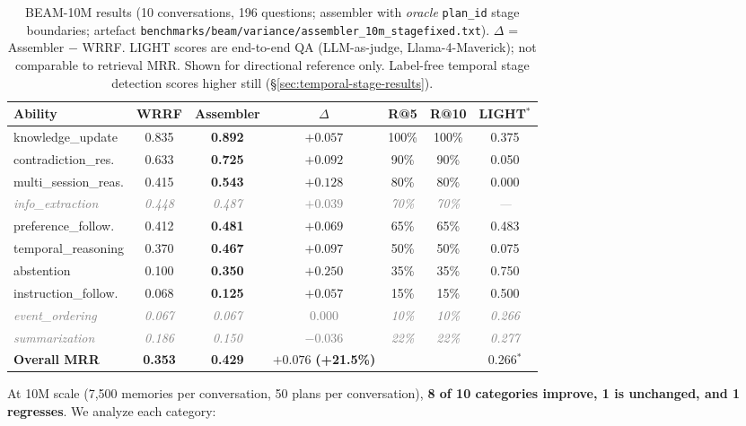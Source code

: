 \documentclass[11pt]{article}
\newcommand{\graynoise}[1]{\textcolor{gray}{\textit{#1}}}
\begin{document}
\begin{table}[t]
\centering
\caption{BEAM-10M results (10 conversations, 196 questions; assembler
  with \emph{oracle} \texttt{plan\_id} stage boundaries; artefact
  \texttt{benchmarks/beam/variance/assembler\_10m\_stagefixed.txt}).
  $\Delta$ = Assembler $-$ WRRF.  LIGHT scores are end-to-end QA
  (LLM-as-judge, Llama-4-Maverick); not comparable to retrieval MRR.
  Shown for directional reference only.  Label-free temporal stage
  detection scores higher still (\S\ref{sec:temporal-stage-results}).}
\label{tab:10m}
\small
\begin{tabular}{lcccccc}
\toprule
Ability & WRRF & Assembler & $\Delta$ & R@5 & R@10 & LIGHT$^*$ \\
\midrule
knowledge\_update & 0.835 & \textbf{0.892} & $+0.057$ & 100\% & 100\% & 0.375 \\
contradiction\_res. & 0.633 & \textbf{0.725} & $+0.092$ & 90\% & 90\% & 0.050 \\
multi\_session\_reas. & 0.415 & \textbf{0.543} & $+0.128$ & 80\% & 80\% & 0.000 \\
\graynoise{info\_extraction} & \graynoise{0.448} & \graynoise{0.487} & \graynoise{$+0.039$} & \graynoise{70\%} & \graynoise{70\%} & \graynoise{---} \\
preference\_follow. & 0.412 & \textbf{0.481} & $+0.069$ & 65\% & 65\% & 0.483 \\
temporal\_reasoning & 0.370 & \textbf{0.467} & $+0.097$ & 50\% & 50\% & 0.075 \\
abstention & 0.100 & \textbf{0.350} & $+0.250$ & 35\% & 35\% & 0.750 \\
instruction\_follow. & 0.068 & \textbf{0.125} & $+0.057$ & 15\% & 15\% & 0.500 \\
\graynoise{event\_ordering} & \graynoise{0.067} & \graynoise{0.067} & \graynoise{$0.000$} & \graynoise{10\%} & \graynoise{10\%} & \graynoise{0.266} \\
\graynoise{summarization} & \graynoise{0.186} & \graynoise{0.150} & \graynoise{$-0.036$} & \graynoise{22\%} & \graynoise{22\%} & \graynoise{0.277} \\
\midrule
\textbf{Overall MRR} & \textbf{0.353} & \textbf{0.429} & $\mathbf{+0.076}$ \textbf{(+21.5\%)} & & & 0.266$^*$ \\
\bottomrule
\end{tabular}
\end{table}

At 10M scale (7,500 memories per conversation, 50 plans per
conversation), \textbf{8 of 10 categories improve, 1 is unchanged,
and 1 regresses}.  We analyze each category:
\end{document}
